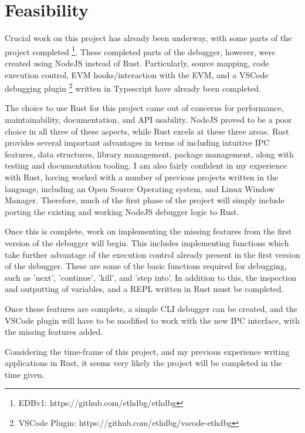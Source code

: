 \documentclass[]{article}
\begin{document}
\newpage
\section{Feasibility}
Crucial work on this project has already been underway, with some parts of the project completed \footnote{EDBv1: https://github.com/ethdbg/ethdbg}. These completed parts of the debugger, however, were created using NodeJS instead of Rust. Particularly, source mapping, code execution control, EVM hooks/interaction with the EVM, and a VSCode debugging plugin \footnote{VSCode Plugin: https://github.com/ethdbg/vscode-ethdbg} written in Typescript have already been completed.

The choice to use Rust for this project came out of concerns for performance, maintainability, documentation, and API usability. NodeJS proved to be a poor choice in all three of these aspects, while Rust excels at these three areas. Rust provides several important advantages in terms of including intuitive IPC features, data structures, library management, package management, along with testing and documentation tooling. I am also fairly confident in my experience with Rust, having worked with a number of previous projects written in the language, including an Open Source Operating system, and Linux Window Manager. Therefore, much of the first phase of the project will simply include porting the existing and working NodeJS debugger logic to Rust.

Once this is complete, work on implementing the missing features from the first version of the debugger will begin. This includes implementing functions which take further advantage of the execution control already present in the first version of the debugger. These are some of the basic functions required for debugging, such as 'next', 'continue', 'kill', and 'step into'. In addition to this, the inspection and outputting of variables, and a REPL written in Rust must be completed.

Once these features are complete, a simple CLI debugger can be created, and the VSCode plugin will have to be modified to work with the new IPC interface, with the missing features added.

Considering the time-frame of this project, and my previous experience writing applications in Rust, it seems very likely the project will be completed in the time given.
 
\end{document}
